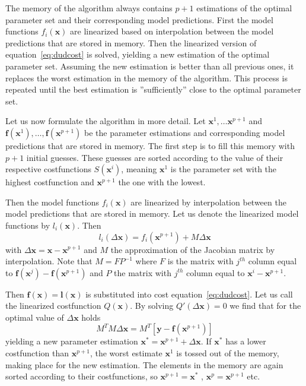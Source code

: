 The memory of the algorithm always contains $p + 1$ estimations of the optimal
parameter set and their corresponding model predictions. First the model
functions $f_i(\mathbf{x})$ are linearized based on interpolation between the
model predictions that are stored in memory. Then the linearized version of
equation~\ref{eq:dudcost} is solved, yielding a new estimation of the optimal
parameter set. Assuming the new estimation is better than all previous ones,
it replaces the worst estimation in the memory of the algorithm. This process
is repeated until the best estimation is ”sufficiently” close to the optimal
parameter set.

Let us now formulate the algorithm in more detail. Let $\mathbf{x}^1 , \ldots
\mathbf{x}^{p+1}$ and
$\mathbf{f}(\mathbf{x}^1), \ldots, \mathbf{f}(\mathbf{x}^{p+1})$ be the
parameter estimations and corresponding model predictions that are stored in
memory. The first step is to fill this memory with $p+1$ initial guesses. These
guesses are sorted according to the value of their respective costfunctions
$S(\mathbf{x}^i)$, meaning $\mathbf{x}^1$ is the parameter set with the highest
costfunction and $\mathbf{x}^{p+1}$ the one with the lowest.

Then the model functions $f_i(\mathbf{x})$ are linearized by interpolation
between the model predictions that are stored in memory. Let us denote the
linearized model functions by $l_i(\mathbf{x})$. Then
\begin{equation}
l_i (\Delta \mathbf{x}) = f_i(\mathbf{x}^{p+1}) + M \Delta \mathbf{x}
\end{equation}
with $\Delta \mathbf{x} = \mathbf{x} - \mathbf{x}^{p+1}$ and $M$ the
approximation of the Jacobian matrix by interpolation. Note that $M = F P^{-1}$
where $F$ is the matrix with $j^{th}$ column equal to $\mathbf{f}(\mathbf{x}^j)
- \mathbf{f}(\mathbf{x}^{p+1})$ and $P$ the matrix with $j^{th}$ column equal
to $\mathbf{x}^i - \mathbf{x}^{p+1}$.

Then $\mathbf{f}(\mathbf{x}) = \mathbf{l}(\mathbf{x})$ is substituted into cost
equation~\ref{eq:dudcost}. Let us call the linearized costfunction
$Q(\mathbf{x})$. By solving $Q'(\Delta \mathbf{x}) = 0$ we find that for the
optimal value of $\Delta \mathbf{x}$ holds
\begin{equation}
M^T M \Delta \mathbf{x} = M^T \left[\mathbf{y} - \mathbf{f}(\mathbf{x}^{p+1})\right]
\end{equation}
yielding a new parameter estimation $\mathbf{x}^\ast = \mathbf{x}^{p+1}
+ \Delta \mathbf{x}$. If $\mathbf{x}^\ast$ has a lower costfunction than
$\mathbf{x}^{p+1}$, the worst estimate $\mathbf{x}^1$ is tossed out of the
memory, making place for the new estimation. The elements in the memory are
again sorted according to their costfunctions, so $\mathbf{x}^{p+1}
= \mathbf{x}^\ast$ , $\mathbf{x}^p = \mathbf{x}^{p+1}$ etc.

